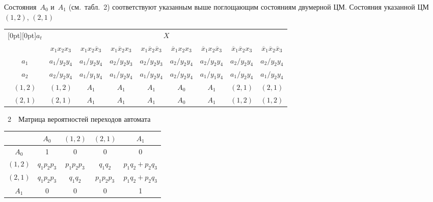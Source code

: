 \begin{multicols}{2}
      
  
     Состояния~$A_0$ и~$A_1$ (см.\ табл.~2) соответствуют указанным выше 
поглощающим состояниям двумерной ЦМ. Состояния указанной ЦМ $(1,2)$, 
$(2,1)$\linebreak\vspace*{-12pt}

\setcounter{table}{2}

\begin{table*}[b]\small %
\vspace*{-12pt}
     \begin{center}
      \vspace*{2ex}
      
      \begin{tabular}{|c|c|c|c|c|c|c|c|c|}
      \hline
      \multicolumn{1}{|c|}{\raisebox{-6pt}[0pt][0pt]{$a_t$}} & \multicolumn{8}{c|}{$X$}\\
      \cline{2-9}
&$x_1x_2x_3$&$x_1x_2 \overline{x}_3$ &$x_1\overline{x}_2 
x_3$&$x_1\overline{x}_2\overline{x}_3$ &$\overline{x}_1 
x_2x_3$&$\overline{x}_1x_2\overline{x}_3$&$\overline{x}_1\overline{x}_2x_3$&
$\overline{x}_1\overline{x}_2\overline{x}_3$\\
\hline
$a_1$&$a_1/y_2y_4$&$a_1/y_2y_4$&$a_2/y_2y_3$&$a_2/y_2y_3$&$a_2/y_2y_4$&$a_2/y_2y_4$&$a
_2/y_2y_4$&$a_2/y_2y_4$\\
$a_2$&$a_2/y_2y_4$&$a_1/y_1y_4$&$a_1/y_2y_4$&$a_1/y_2y_4$&$a_2/y_2y_4$&$a_1/y_1y_4$&$a_1/y_2y_4$&$a_1/y_2y_4$\\
$(1,2)$&$(1,2)$&$A_1$&$A_1$&$A_1$&$A_0$&$A_1$&$(2,1)$&$(2,1)$\\
$(2,1)$&$(2,1)$&$A_1$&$A_1$&$A_1$&$A_0$&$A_1$&$(1,2)$&$(1,2)$\\
\hline
\end{tabular}
\end{center}
\end{table*}

\pagebreak

{\small   %
\begin{center}
{{\tablename~2}\ \ \small{Матрица вероятностей переходов автомата}}
\vspace*{2ex}


 \tabcolsep=7.6pt
      \begin{tabular}{|c|c|c|c|c|}
      \hline
      & $A_0$ & $(1,2)$ & $(2,1)$ & $A_1$\\
      \hline
      $A_0$ & 1& 0&0&0\\
      $(1,2)$ & $q_1p_2p_3$ & $p_1p_2p_3$ & $q_1q_2$ & $p_1q_2+p_2q_3$\\
      $(2,1)$ & $q_1p_2p_3$ & $q_1q_2$ & $p_1p_2p_3$ & $p_1q_2+p_2q_3$\\
      $A_1$ & 0&0&0&1\\
      \hline
      \end{tabular}
\end{center}
\vspace*{12pt}
}




\end{multicols}
